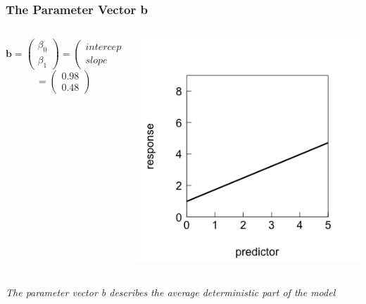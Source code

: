 \documentclass{beamer}
\begin{document}
\begin{frame}
\frametitle{The Parameter Vector b}
    \begin{columns}
        \begin{column}{0.5\textwidth}
\[
\boldsymbol{b} = 
\begin{pmatrix}
\beta_0 \\
\beta_1
\end{pmatrix} =
\begin{pmatrix}
intercept \\
slope
\end{pmatrix}
\]
\[
=
\begin{pmatrix}
0.98 \\
0.48
\end{pmatrix}
\]
        \end{column}
        \begin{column}{0.5\textwidth}
            \includegraphics[width=\textwidth]{lectures/day_5_theory_of_mems/figures/unnamed-chunk-5-1.png}
        \end{column}
    \end{columns}
    \vspace{0.3cm}
    
    \large \textit{The parameter vector b describes the average deterministic part of the model}
\end{frame}
\end{document}
